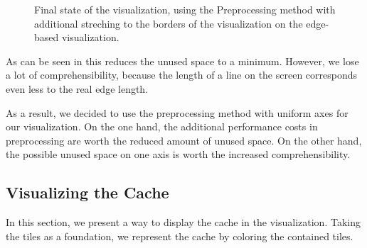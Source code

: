 \documentclass
[
    paper = a4,
    pagesize,
    12 pt,
    oneside,                       %
    open = right,
    DIV = calc,
    BCOR = 0 mm,                   %
    bibtotoc
]
{scrbook}
\begin{document}
\begin{figure}
\caption[]{Final state of the visualization, using the Preprocessing method with additional streching to the borders of the visualization on the edge-based visualization.}
\label{fig:spreaded_axis}
\end{figure}

As can be seen in  this reduces the unused space to a minimum.
However, we lose a lot of comprehensibility, because the length of a line on the screen corresponds even less to the real edge length.

As a result, we decided to use the preprocessing method with uniform axes for our visualization.
On the one hand, the additional performance costs in preprocessing are worth the reduced amount of unused space.
On the other hand, the possible unused space on one axis is worth the increased comprehensibility.


\subsection{Visualizing the Cache} \label{cache}

In this section, we present a way to display the cache in the visualization.
Taking the tiles as a foundation, we represent the cache by coloring the contained tiles.
\end{document}
